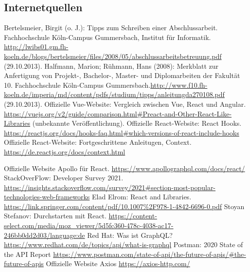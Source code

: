 \documentclass[a4paper,12pt,oneside]{article}
\begin{document}
     \subsection{Internetquellen}
     \begin{thebibliography}{HR08} %
       Bertelsmeier, Birgit (o. J.): Tipps zum Schrei\-b\-en ei\-n\-er Ab\-sch\-luss\-ar\-beit. Fach\-hoch\-schu\-le Köln-Campus Gummersbach, Institut für Informatik. \url{http://lwibs01.gm.fh-koeln.de/blogs/bertelsmeier/files/2008/05/abschlussarbeitsbetreuung.pdf} (29.10.2013).
         Halfmann, Marion; Rühmann, Hans (2008): Merkblatt zur Anfertigung von Projekt-, Bachelor-, Master- und Diplomarbeiten der Fakultät 10. Fachhochschule Köln-Campus Gummersbach.\url{http://www.f10.fh-koeln.de/imperia/md/content/pdfs/studium/tipps/anleitungda270108.pdf} (29.10.2013).
         Offizielle Vue-Website: Vergleich zwischen Vue, React und Angular. \\ 
        \url{https://vuejs.org/v2/guide/comparison.html#Preact-and-Other-React-Like-Libraries} (unbekannte Veröffentlichung).
        Offizielle React-Website: React Hooks. \url{https://reactjs.org/docs/hooks-faq.html#which-versions-of-react-include-hooks}
        Offizielle React-Website: Fortgeschrittene Anleitugen, Context. \url{https://de.reactjs.org/docs/context.html}

        Offizielle Website Apollo für React. \url{https://www.apollographql.com/docs/react/}
        StackOverFlow: Developer Survey 2021. \url{https://insights.stackoverflow.com/survey/2021#section-most-popular-technologies-web-frameworks}
        Elad Elrom: React and Libraries. \url{https://link.springer.com/content/pdf/10.1007%2F978-1-4842-6696-0.pdf}
        Stoyan Stefanov: Durchstarten mit React. \url{https://content-select.com/media/moz_viewer/5d5fc360-478c-4038-ac17-246bb0dd2d03/language:de}
        Red Hat: Was ist GraphQL? \url{https://www.redhat.com/de/topics/api/what-is-graphql}
        Postman: 2020 State of the API Report \url{https://www.postman.com/state-of-api/the-future-of-apis/#the-future-of-apis}
        Offizielle Website Axios \url{https://axios-http.com/}

        
        
     \end{thebibliography} 
  
\end{document}
